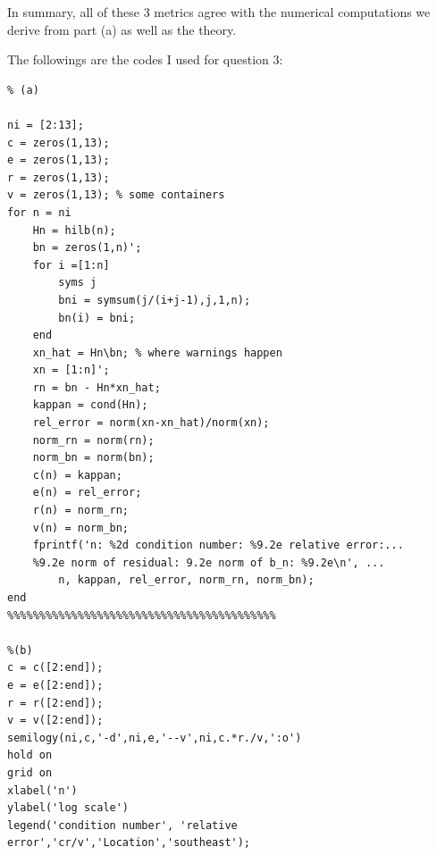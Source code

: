 \documentclass[12pt]{article}
\begin{document}
In summary, all of these 3 metrics agree with the numerical computations we derive from part (a) as well as the theory.

The followings are the codes I used for question 3:
\begin{lstlisting}
% (a)

ni = [2:13];
c = zeros(1,13);
e = zeros(1,13);
r = zeros(1,13);
v = zeros(1,13); % some containers
for n = ni
    Hn = hilb(n);
    bn = zeros(1,n)';
    for i =[1:n]
        syms j
        bni = symsum(j/(i+j-1),j,1,n);
        bn(i) = bni;
    end
    xn_hat = Hn\bn; % where warnings happen
    xn = [1:n]';
    rn = bn - Hn*xn_hat;
    kappan = cond(Hn);
    rel_error = norm(xn-xn_hat)/norm(xn);
    norm_rn = norm(rn);
    norm_bn = norm(bn);
    c(n) = kappan;
    e(n) = rel_error;
    r(n) = norm_rn;
    v(n) = norm_bn;
    fprintf('n: %2d condition number: %9.2e relative error:...
    %9.2e norm of residual: 9.2e norm of b_n: %9.2e\n', ...
        n, kappan, rel_error, norm_rn, norm_bn);
end
%%%%%%%%%%%%%%%%%%%%%%%%%%%%%%%%%%%%%%%%%%

%(b)
c = c([2:end]);
e = e([2:end]);
r = r([2:end]);
v = v([2:end]);
semilogy(ni,c,'-d',ni,e,'--v',ni,c.*r./v,':o')
hold on
grid on
xlabel('n')
ylabel('log scale')
legend('condition number', 'relative error','cr/v','Location','southeast');
\end{lstlisting}
\end{document}
